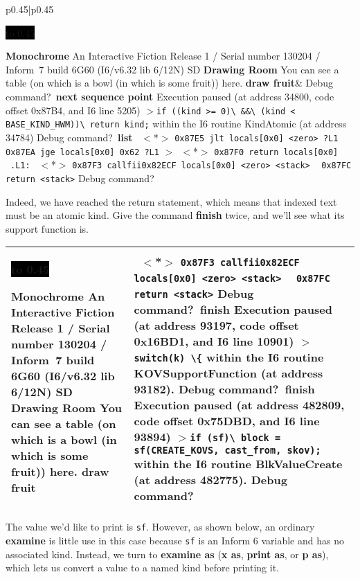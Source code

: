 \documentclass{book}
\newcommand{\n}{\hspace*{\fill}\newline}
\newcommand{\terp}[2]{\begin{center}\begin{tabular}{p{0.45\textwidth}|p{0.45\textwidth}}\midrule #1&#2\\\midrule\end{tabular}\end{center}}
\newcommand{\glkheading}[1]{\textbf{#1}}
\newcommand{\glkinput}[1]{\textbf{#1}}
\newcommand{\glkstatusline}[2]{\centerline{\colorbox{black}{\hbox to 0.45\textwidth{\textcolor{white}{#1\hfil #2}}}}}
\newcommand{\storyprompt}{\raisebox{1.5pt}{\(>\)}}
\newcommand{\cursor}{\raisebox{-1.5pt}{\RectangleThin}}
\newcommand{\markedindent}{\(>\)\qquad}
\newcommand{\markeddip}{\(>\)\ }
\newcommand{\unmarkeddip}{\hphantom{\(>\)}\ }
\newcommand{\unmarkeddipb}{\ \hphantom{\(>\)}}
\begin{document}
\terp{\glkstatusline{Drawing Room}{0/1}\n
  \glkheading{Monochrome}\n
  An Interactive Fiction\n
  Release 1 / Serial number 130204 / Inform~7 build 6G60 (I6/v6.32 lib 6/12N) SD\n
  \n
  \glkheading{Drawing Room}\n
  You can see a table (on which is a bowl (in which is some fruit)) here.\n
  \n
  \storyprompt\glkinput{draw fruit}}{%
  \n
  Debug command?\ \glkinput{next sequence point}\n
  \n
  Execution paused (at address 34800, code offset 0x87B4, and I6 line 5205)\n
  \markedindent \lstinline{if ((kind >= 0)}\lstinline{\ &&}\lstinline{\ (kind < BASE_KIND_HWM))}\lstinline{\ return kind;}\n
  within the I6 routine KindAtomic (at address 34784)\n
  \n
  Debug command?\ \glkinput{list}\n
  \n
  \unmarkeddip \(<\)*\(>\) \lstinline{0x87E5 jlt locals[0x0] <zero> ?L1}\n
  \unmarkeddip \hphantom{\(<\)*\(>\)} \lstinline{0x87EA jge locals[0x0] 0x62 ?L1}\n
  \markeddip \(<\)*\(>\) \lstinline{0x87F0 return locals[0x0]}\n
  \unmarkeddip \lstinline{.L1:}\n
  \unmarkeddip \(<\)*\(>\) \lstinline @0x87F3 callfii@\hfill\lstinline @0x82ECF locals[0x0] <zero> <stack>@\n
  \unmarkeddip \hphantom{\(<\)*\(>\)} \lstinline{0x87FC return <stack>}\n
  \n
  Debug command?\ \cursor}

Indeed, we have reached the return statement, which means that indexed text must
be an atomic kind.  Give the command \glkinput{finish} twice, and we'll see what
its support function is.

\terp{\glkstatusline{Drawing Room}{0/1}\n
  \glkheading{Monochrome}\n
  An Interactive Fiction\n
  Release 1 / Serial number 130204 / Inform~7 build 6G60 (I6/v6.32 lib 6/12N) SD\n
  \n
  \glkheading{Drawing Room}\n
  You can see a table (on which is a bowl (in which is some fruit)) here.\n
  \n
  \storyprompt\glkinput{draw fruit}}{%
  \unmarkeddipb \(<\)*\(>\) \lstinline @0x87F3 callfii@\hfill\lstinline @0x82ECF locals[0x0] <zero> <stack>@\n
  \unmarkeddip \hphantom{\(<\)*\(>\)} \lstinline{0x87FC return <stack>}\n
  \n
  Debug command?\ \glkinput{finish}\n
  \n
  Execution paused (at address 93197, code offset 0x16BD1, and I6 line 10901)\n
  \markedindent \lstinline @switch(k) \{@\n
  within the I6 routine KOVSupportFunction (at address 93182).\n
  \n
  Debug command?\ \glkinput{finish}\n
  \n
  Execution paused (at address 482809, code offset 0x75DBD, and I6 line 93894)\n
  \markedindent \lstinline{if (sf)}\lstinline{\ block = sf(CREATE_KOVS, cast_from, skov);}\n
  within the I6 routine BlkValueCreate (at address 482775).\n
  \n
  Debug command?\ \cursor}

The value we'd like to print is \lstinline{sf}.  However, as shown below, an
ordinary \glkinput{examine} is little use in this case because \lstinline{sf} is
an Inform 6 variable and has no associated kind.  Instead, we turn to
\glkinput{examine as} (\glkinput{x as}, \glkinput{print as}, or \glkinput{p
  as}), which lets us convert a value to a named kind before printing it.
\end{document}
